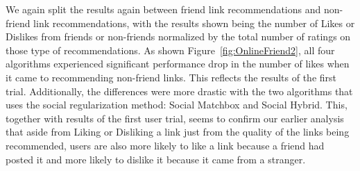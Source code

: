 We again split the results again between friend link recommendations and non-friend link recommendations, with the results shown being the number of Likes or Dislikes from friends or non-friends normalized by the total number of ratings on those type of recommendations. As shown Figure~\ref{fig:OnlineFriend2}, all four algorithms experienced significant performance drop in the number of likes when it came to recommending non-friend links. This reflects the results of the first trial. Additionally, the differences were more drastic with the two algorithms that uses the social regularization method: Social Matchbox and Social Hybrid. This, together with results of the first user trial, seems to confirm our earlier analysis that aside from Liking or Disliking a link just from the quality of the links being recommended, users are also more likely to like a link because a friend had posted it and more likely to dislike it because it came from a stranger.

